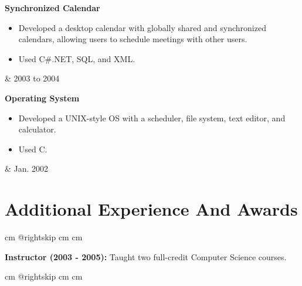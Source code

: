 \documentclass[10pt, letterpaper]{article}
\newenvironment{highlights}{
        \begin{itemize}[
                topsep=0pt,
                parsep=0.10 cm,
                partopsep=0pt,
                itemsep=0pt,
                after=\vspace{-1\baselineskip},
                leftmargin=0.4 cm + 3pt
            ]
    }{
        \end{itemize}
    } %
\let\originalTabularx\tabularx
\let\originalEndTabularx\endtabularx
\renewenvironment{tabularx}{\bgroup\centering\originalTabularx}{\originalEndTabularx\par\egroup}
\begin{document}
        \vspace{0.2 cm}
        \begin{tabularx}{
            \textwidth-0.4 cm-0.13cm
        }{
            K{0.2 cm}
            R{4.1 cm}
        }
            \textbf{Synchronized Calendar}

            \vspace{0.10 cm}

            \begin{highlights}
                \item Developed a desktop calendar with globally shared and synchronized calendars, allowing users to schedule meetings with other users.
                \item Used C\#.NET, SQL, and XML.
            \end{highlights}
            &
            2003 to 2004
        \end{tabularx}


        \vspace{0.2 cm}
        \begin{tabularx}{
            \textwidth-0.4 cm-0.13cm
        }{
            K{0.2 cm}
            R{4.1 cm}
        }
            \textbf{Operating System}

            \vspace{0.10 cm}

            \begin{highlights}
                \item Developed a UNIX-style OS with a scheduler, file system, text editor, and calculator.
                \item Used C.
            \end{highlights}
            &
            Jan. 2002
        \end{tabularx}



    
    \section{Additional Experience And Awards}

        \begingroup{} cm
        \advance\csname @rightskip cm
        \advance{} cm

        \textbf{Instructor (2003 - 2005):} Taught two full-credit Computer Science courses.
        \par\endgroup

        \vspace{0.2 cm}
        \begingroup{} cm
        \advance\csname @rightskip cm
        \advance{} cm
\end{document}
